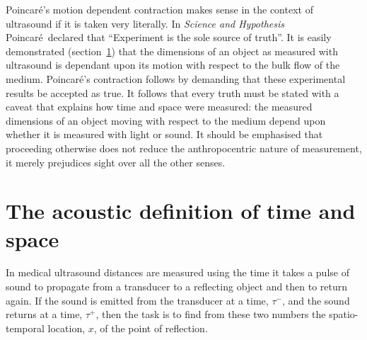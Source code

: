 \documentclass[10pt, fleqn,final,showtrims,oldfontcommands]{article} %
\newcommand{\secref}[1]{section~\ref{sec:#1}}
\newcommand{\tm}{\tau^-}
\newcommand{\tp}{\tau^+}
\newcommand{\aetherial}{\ae therial}
\newcommand{\Poincare}{Poincar{\'e}}
\begin{document}
\Poincare's motion dependent contraction makes sense in the context of ultrasound if it is taken very literally.
In {\em Science and Hypothesis}\cite{Poincare1902} \Poincare\ declared that ``Experiment is the sole source of truth''.
It is easily demonstrated (\secref{measurement}) that the dimensions of an object as  measured with  ultrasound 
is dependant upon its motion with respect to the bulk flow of the medium.
\Poincare's contraction follows by  demanding that these experimental results be accepted as true.
It follows that  every truth  must be stated with a caveat that explains how time and space were  measured: 
the measured dimensions of an object moving with respect to the medium   depend upon whether it is measured with light or sound.
It should be emphasised that  proceeding otherwise does not reduce the anthropocentric nature of measurement, 
it merely prejudices sight over all the other senses.







\section{The acoustic definition of time and space}\label{sec:measurement}


In medical ultrasound distances are measured using the time it takes a pulse of sound to propagate from a transducer
to a reflecting object and then to return again. 
If the sound is emitted from the transducer at a time, $\tm$,
and the sound returns at a time,  $\tp$,
then the task is to find from these two numbers the spatio-temporal location, $x$,
of the point of reflection.
\end{document}
